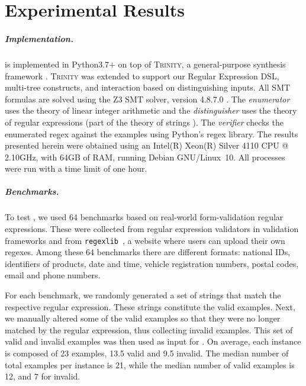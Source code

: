 \chapter{Experimental Results}\label{chap:results}

\paragraph{Implementation.}
\Forest{} is implemented in Python3.7+ on top of \textsc{Trinity}, a general-purpose synthesis framework \cite{trinity19}. \textsc{Trinity} was extended to support our Regular Expression \ac{DSL}, multi-tree constructs, and interaction based on distinguishing inputs. All \ac{SMT} formulas are solved using the Z3 SMT solver, version  4.8.7.0 \cite{z3}. The \textit{enumerator} uses the theory of linear integer arithmetic and the \textit{distinguisher} uses the theory of regular expressions (part of the theory of strings \cite{z3str317}). The \textit{verifier} checks the enumerated regex against the examples using Python's regex library.
%
The results presented herein were obtained using an Intel(R) Xeon(R) Silver 4110 CPU @ 2.10GHz, with 64GB of RAM, running Debian GNU/Linux~10. All processes were run with a time limit of one hour.

\paragraph{Benchmarks.} To test \Forest{}, we used 64 benchmarks based on real-world form-validation regular expressions. These were collected from regular expression validators in validation frameworks and from \texttt{regexlib}~\cite{regexlib}, a website where users can upload their own regexes. Among these 64 benchmarks there are different formats: national IDs, identifiers of products, date and time, vehicle registration numbers, postal codes, email and phone numbers.

For each benchmark, we randomly generated a set of strings that match the respective regular expression. These strings constitute the valid examples. Next, we manually altered some of the valid examples so that they were no longer matched by the regular expression, thus collecting invalid examples. This set of valid and invalid examples was then used as input for \Forest{}.
On average, each instance is composed of 23 examples, 13.5 valid and 9.5 invalid. The median number of total examples per instance is 21, while the median number of valid examples is 12, and 7 for invalid.

